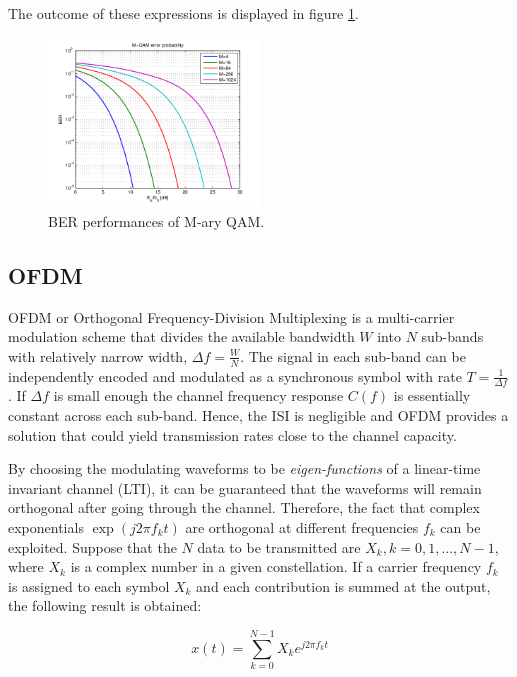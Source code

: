 \documentclass[12pt,a4paper,openright]{report}
\begin{document}
The outcome of these expressions is displayed in figure \ref{fig:mqamber}.

 \begin{figure}[H]
  \centering
    \includegraphics[width=0.5\textwidth]{MQAMber.png}
    \caption[BER performances of M-ary QAM]{BER performances of M-ary QAM.}
    \label{fig:mqamber}
\end{figure}




\subsection{OFDM}

OFDM or Orthogonal Frequency-Division Multiplexing is a multi-carrier modulation scheme that divides the available bandwidth $W$ into $N$ sub-bands with relatively narrow width, $\Delta f = \frac{W}{N}$. The signal in each sub-band can be independently encoded and modulated as a synchronous symbol with rate $T = \frac{1}{\Delta f}$. If $\Delta f$ is small enough the channel frequency response $C(f)$ is essentially constant across each sub-band. Hence, the ISI is negligible and OFDM provides a solution that could yield transmission rates close to the channel capacity. 

By choosing the modulating waveforms to be \emph{eigen-functions} of a linear-time invariant channel (LTI), it can be guaranteed that the waveforms will remain orthogonal after going through the channel. Therefore, the fact that complex exponentials $\exp{(j2\pi f_k t)}$ are orthogonal at different frequencies $f_k$  can be exploited.  Suppose that the $N$ data to be transmitted are $X_k, k=0,1,...,N-1$, where $X_k$ is a complex number in a given constellation. If a carrier frequency $f_k$ is assigned to each symbol $X_k$ and each contribution is summed at the output, the following result is obtained:

\begin{equation}
x(t) = \sum\limits_{k = 0}^{N - 1} {{X_k}{e^{j2\pi {f_k}t}}}
\end{equation}
\end{document}
